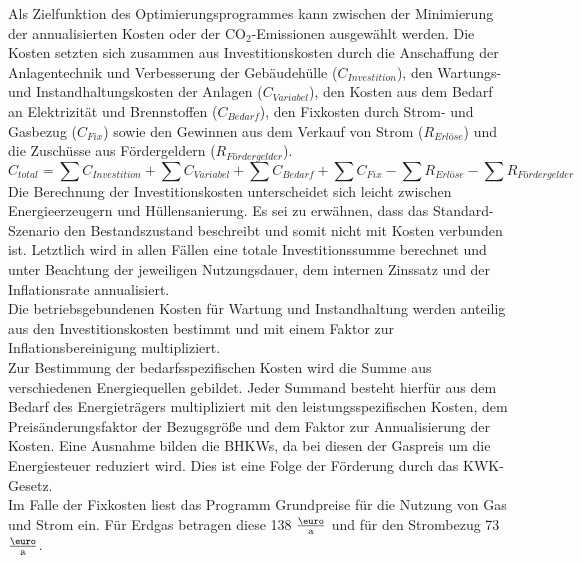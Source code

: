 Als Zielfunktion des Optimierungsprogrammes kann zwischen der Minimierung der annualisierten Kosten oder der CO\(_2\)-Emissionen ausgewählt werden.
Die Kosten setzten sich zusammen aus Investitionskosten durch die Anschaffung der Anlagentechnik und Verbesserung der Gebäudehülle (\(C_{Investition}\)), den Wartungs- und Instandhaltungskosten der Anlagen (\(C_{Variabel}\)), den Kosten aus dem Bedarf an Elektrizität und Brennstoffen (\(C_{Bedarf}\)), den Fixkosten durch Strom- und Gasbezug (\(C_{Fix}\)) sowie den Gewinnen aus dem Verkauf von Strom (\(R_{Erlöse}\)) und die Zuschüsse aus Fördergeldern (\(R_{Fördergelder}\)).
\begin{equation}
\label{eq:Gleichung2621}
C_{total} = \sum C_{Investition} + \sum C_{Variabel} + \sum C_{Bedarf} + \sum C_{Fix} - \sum R_{Erlöse} - \sum R_{Fördergelder}  
\end{equation}
Die Berechnung der Investitionskosten unterscheidet sich leicht zwischen Energieerzeugern und Hüllensanierung. 
Es sei zu erwähnen, dass das Standard-Szenario den Bestandszustand beschreibt und somit nicht mit Kosten verbunden ist.
Letztlich wird in allen Fällen eine totale Investitionssumme berechnet und unter Beachtung der jeweiligen Nutzungsdauer, dem internen Zinssatz und der Inflationsrate annualisiert.\\
Die betriebsgebundenen Kosten für Wartung und Instandhaltung werden anteilig aus den Investitionskosten bestimmt und mit einem Faktor zur Inflationsbereinigung multipliziert.\\
Zur Bestimmung der bedarfsspezifischen Kosten wird die Summe aus verschiedenen Energiequellen gebildet. Jeder Summand besteht hierfür aus dem Bedarf des Energieträgers multipliziert mit den leistungsspezifischen Kosten, dem Preisänderungsfaktor der Bezugsgröße und dem Faktor zur Annualisierung der Kosten. 
Eine Ausnahme bilden die BHKWs, da bei diesen der Gaspreis um die Energiesteuer reduziert wird.
Dies ist eine Folge der Förderung durch das KWK-Gesetz.\\
Im Falle der Fixkosten liest das Programm Grundpreise für die Nutzung von Gas und Strom ein.
Für Erdgas betragen diese 138 \(\frac{\text{\euro}}{\text{a}}\) und für den Strombezug 73 \(\frac{\text{\euro}}{\text{a}}\). \\


